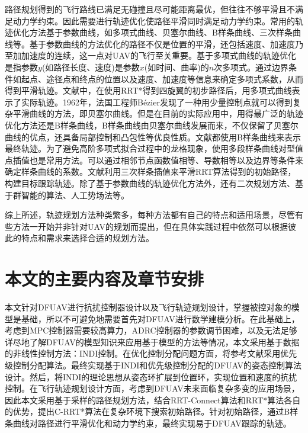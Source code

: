 路径规划得到的飞行路线已满足无碰撞且尽可能距离最优，但往往不够平滑且不满足动力学约束。因此需要进行轨迹优化使路径平滑同时满足动力学约束。常用的轨迹优化方法基于参数曲线，如多项式曲线、贝塞尔曲线、B样条曲线、三次样条曲线等。基于参数曲线的方法优化的路径不仅是位置的平滑，还包括速度、加速度乃至加加速度的连续，这一点对UAV的飞行至关重要。基于多项式曲线的轨迹优化是指参数$y$(如路径长度、速度)是参数$x$(如时间、曲率)的$n$次多项式。通过边界条件如起点、途径点和终点的位置以及速度、加速度等信息来确定多项式系数，从而得到平滑轨迹。文献\parencite{arshadQuadrotorPathPlanning2023}中，在使用RRT*得到四旋翼的初步路径后，用多项式曲线表示了实际轨迹。1962年，法国工程师Bézier发现了一种用少量控制点就可以得到复杂平滑曲线的方法，即贝塞尔曲线。但是在目前的实际应用中，用得最广泛的轨迹优化方法还是B样条曲线，B样条曲线由贝塞尔曲线发展而来，不仅保留了贝塞尔曲线的优点，还具备局部控制和凸包性等优良性质。文献\parencite{eshtehardianContinuousRRTbasedPath2023,fengSmoothPathPlanning2024a,wangPathPlanningProstate2025,liAdaptiveBiDirectionalRRT2025}都使用B样条曲线来表示最终轨迹。为了避免高阶多项式拟合过程中的龙格现象，使用多段样条曲线对型值点插值也是常用方法。可以通过相邻节点函数值相等、导数相等以及边界等条件来确定样条曲线的系数。文献\parencite{yangDesignUAVPath2024}利用三次样条插值来平滑RRT算法得到的初始路径，构建目标跟踪轨迹。除了基于参数曲线的轨迹优化方法外，还有二次规划方法\cite{arshadQuadrotorPathPlanning2023}、基于群智能的算法\cite{wuNovelHybridEnhanced2025,XDDJ202504020}、人工势场法\cite{haoUAVPathPlanning2023,liuImprovedArtificialPotential2024}等。

综上所述，轨迹规划方法种类繁多，每种方法都有自己的特点和适用场景，尽管有些方法一开始并非针对UAV的规划而提出，但在具体实践过程中依然可以根据彼此的特点和需求来选择合适的规划方法。

\section{本文的主要内容及章节安排}

本文针对DFUAV进行抗扰控制器设计以及飞行轨迹规划设计，掌握被控对象的模型是基础，所以不可避免地需要首先对DFUAV进行数学建模分析。在此基础上，考虑到MPC控制器需要较高算力，ADRC控制器的参数调节困难，以及无法足够详尽地了解DFUAV的模型知识来应用基于模型的方法等情况，本文采用基于数据的非线性控制方法：INDI控制。在优化控制分配问题方面，将参考文献\parencite{HKXB202010026}采用优先级控制分配算法。最终实现基于INDI和优先级控制分配的DFUAV的姿态控制算法设计。然后，将INDI的理论思想从姿态环扩展到位置环，实现位置和速度的抗扰控制。在飞行轨迹规划设计方面，考虑到DFUAV未来面临复杂多变的应用场景，因此本文采用基于采样的路径规划方法，结合RRT-Connect算法和RRT*算法各自的优势，提出C-RRT*算法在复杂环境下搜索初始路径。针对初始路径，通过B样条曲线对路径进行平滑优化和动力学约束，最终实现易于DFUAV跟踪的轨迹。

